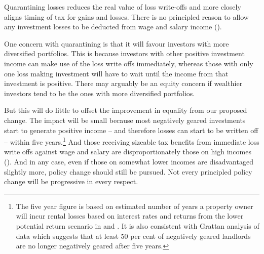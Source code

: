 \documentclass{grattanAlpha}\usepackage[]{graphicx}\usepackage[]{color}
\begin{document}
Quarantining losses reduces the real value of loss write-offs and more closely aligns timing of tax for gains and losses. There is no principled reason to allow any investment losses to be deducted from wage and salary income (). 

One concern with quarantining is that it will favour investors with more diversified portfolios. This is because investors with other positive investment income can make use of the loss write offs immediately, whereas those with only one loss making investment will have to wait until the income from that investment is positive. There may arguably be an equity concern if wealthier investors tend to be the ones with more diversified portfolios. 

But this will do little to offset the improvement in equality from our proposed change. 
The impact will be small because most negatively geared investments start to generate positive income – and therefore losses can start to be written off – within five years.\footnote{The five year figure\label{footnote:number-years-for-NG} is based on estimated number of years a property owner will incur rental losses based on interest rates and returns from the lower potential return scenario in  and . It is also consistent with Grattan analysis of \textcite{HILDA2015} data which suggests that at least 50 per cent of negatively geared landlords are no longer negatively geared after five years. }  
And those receiving sizeable tax benefits from immediate loss write offs against wage and salary are disproportionately those on high incomes (). 
And in any case, even if those on somewhat lower incomes are disadvantaged slightly more, policy change should still be pursued. Not every principled policy change will be progressive in every respect.
\end{document}
